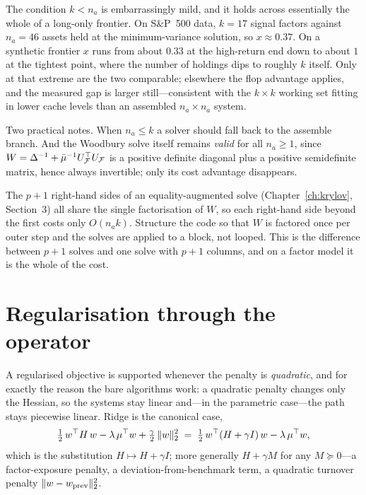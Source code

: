 The condition $k < n_a$ is embarrassingly mild, and it holds across essentially the
whole of a long-only frontier. On S\&P~500 data, $k = 17$ signal factors against
$n_a = 46$ assets held at the minimum-variance solution, so $x \approx 0.37$. On a
synthetic frontier $x$ runs from about $0.33$ at the high-return end down to about $1$
at the tightest point, where the number of holdings dips to roughly $k$ itself. Only at
that extreme are the two comparable; elsewhere the flop advantage applies, and the
measured gap is larger still---consistent with the $k\times k$ working set fitting in
lower cache levels than an assembled $n_a \times n_a$ system.

Two practical notes. When $n_a \le k$ a solver should fall back to the assemble branch.
And the Woodbury solve itself remains \emph{valid} for all $n_a \ge 1$, since
$W = \Delta^{-1} + \bar\mu^{-1}U_{\mathcal{F}}^{\top} U_{\mathcal{F}}$ is a positive definite diagonal plus
a positive semidefinite matrix, hence always invertible; only its cost advantage
disappears.

\begin{remark}
The $p+1$ right-hand sides of an equality-augmented solve
(Chapter~\ref{ch:krylov}, Section~3) all share the single factorisation of $W$, so each
right-hand side beyond the first costs only $O(n_a k)$. Structure the code so that
$W$ is factored once per outer step and the solves are applied to a block, not looped.
This is the difference between $p+1$ solves and one solve with $p+1$ columns, and on a
factor model it is the whole of the cost.
\end{remark}

\section{Regularisation through the operator}
\label{sec:reg-operator}

A regularised objective is supported whenever the penalty is \emph{quadratic}, and for
exactly the reason the bare algorithms work: a quadratic penalty changes only the
Hessian, so the systems stay linear and---in the parametric case---the path stays
piecewise linear. Ridge is the canonical case,
\begin{equation}
\label{eq:ridge}
\tfrac12\, w^{\top} H\, w - \lambda\,\mu^{\top} w + \tfrac{\gamma}{2}\,\lVert w \rVert_2^2
\;=\;
\tfrac12\, w^{\top}(H + \gamma I)\, w - \lambda\,\mu^{\top} w,
\end{equation}
which is the substitution $H \mapsto H + \gamma I$; more generally $H + \gamma M$ for
any $M \succeq 0$---a factor-exposure penalty, a deviation-from-benchmark term, a
quadratic turnover penalty $\lVert w - w_{\mathrm{prev}} \rVert_2^2$.

